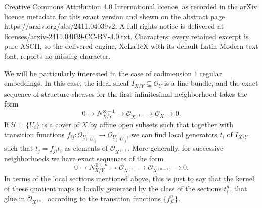 \documentclass[10pt,a4paper]{amsart}
\newcommand{\OO}{\mathcal{O}}
\newcommand{\U}{\mathcal{U}}
\begin{document}
Creative Commons Attribution 4.0 International licence, as recorded in the arXiv licence metadata for this exact version and shown on the abstract page https://arxiv.org/abs/2411.04039v2. A full rights notice is delivered at licenses/arxiv-2411.04039-CC-BY-4.0.txt. Characters: every retained excerpt is pure ASCII, so the delivered engine, XeLaTeX with its default Latin Modern text font, reports no missing character.
\begin{remark} \label{los_t's}
    We will be particularly interested in the case of codimension $1$ regular embeddings. In this case, the ideal sheaf $I_{X/Y}\subseteq \OO_Y$ is a line bundle, and the exact sequence of structure sheaves for the first infinitesimal neighborhood takes the form
$$ 0 \rightarrow N_{X/Y}^{\otimes -1} \rightarrow \OO_{X^{(1)}}\rightarrow \OO_X \rightarrow 0.$$
If $\U = \{U_i\}$ is a cover of $X$ by affine open subsets such that \smash{$N_{X/Y}^{\otimes -1}\big|_{U_i}\simeq \OO_{U_i}$} together with transition functions $f_{ij}:\OO_{U_i}\vert_{U_{ij}}\to \OO_{U_j}\vert_{U_{ij}}$, we can find local generators $t_i$ of $I_{X/Y}$ such that $t_j=f_{ji} t_i$ as elements of $\OO_{X^{(1)}}$.
More generally, for successive neighborhoods we have exact sequences of the form
\begin{equation}\label{sucesive_thickenings}
0 \rightarrow N_{X/Y}^{\otimes - n} \rightarrow \OO_{X^{(n)}}\rightarrow \OO_{X^{(n-1)}}\rightarrow 0. 
\end{equation}
In terms of the local sections mentioned above, this is just to say that the kernel of these quotient maps is locally generated by the class of the sections $t_i^n$, that glue in $\OO_{X^{(n)}}$ according to the transition functions $\{f_{ji}^n\}$. 
\end{remark}
\end{document}
